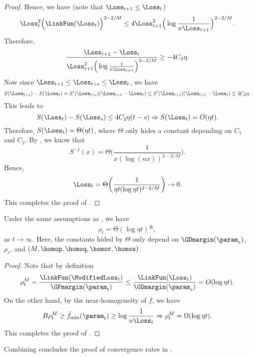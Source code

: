 \begin{proof}
Hence, we have (note that $\Loss_{t+1} \le \Loss_t$)
\[
    \Loss_t^2 \Big(\LinkFun(\Loss_t)\Big)^{2-2 / M} \le 4 \Loss_{t+1}^2 \Big(\log \frac{1}{n \Loss_{t+1}}\Big)^{2-2 / M}. 
\] 
Therefore, 
\[
    \frac{ \Loss_{t+1} - \Loss_t}{\Loss_{t+1}^2 \Big(\log \frac{1}{n \Loss_{t+1}}\Big)^{2-2 / M}} \ge - 4 C_2 \eta. 
\] 
Now since $\Loss_{t+1} \le \Loss_{t+\epsilon} \le \Loss_t$, we have
\[
S(\Loss_{t+1}) - S(\Loss_t)  = S^\prime (\Loss_{t+\epsilon}) (\Loss_{t+1} - \Loss_t)  \le  S^\prime (\Loss_{t+1}) (\Loss_{t+1} - \Loss_t) \le 4 C_2 \eta. 
\] 
This leads to 
\[
S(\Loss_t) - S(\Loss_s) \le 4 C_2 \eta(t-s) \Rightarrow S(\Loss_t) = O( \eta t).
\] 
Therefore, $S(\Loss_t) = \Theta( \eta t)$, where $\Theta$ only hides a constant depending on $C_1$ and $C_2$.
By , we know that 
\[
    S^{-1}(x) = \Theta \bigg( \frac{1}{x (\log(nx))^{2-2/M}} \bigg). 
\]
Hence, 
\[
\Loss_t =  \Theta \bigg( \frac{1}{\eta t (\log  \eta t)^{2-2/M}} \bigg) \to 0.
\] 
This completes the proof of . 
\end{proof}


\begin{lemma}
\label{lem: Parameter convergence rate for GD}
Under the same assumptions as , we have
\begin{equation}
\label{eq:param-convergence-rate-gd}
       \rho_t = \Theta  ( \log \eta t)^{\frac{1}{M}},  
\end{equation}
as $t \to \infty$. Here, the constants hided by $\Theta$ only depend on $\GDmargin(\param_s)$, $\rho_s$, and $(M, \homop, \homoq, \homor, \homos)$.
\end{lemma}
\begin{proof}
    Note that by definition
    \[
    \rho_t^M = \frac{\LinkFun(\ModifiedLoss_t)}{\GFmargin(\param_t)} \le \frac{\LinkFun(\Loss_t)}{\GDmargin(\param_s)} = O(\log \eta t). 
    \] 
On the other hand, by the near-homogeneity of $f$, we have 
\[
    B \rho_t^M \ge \bar f_{\min} (\param_t) \ge \log \frac{1}{n \Loss_t} \Rightarrow \rho_t^M = \Omega( \log \eta t).
\] 
This completes the proof of .
\end{proof}

Combining  concludes the proof of convergence rates in .


